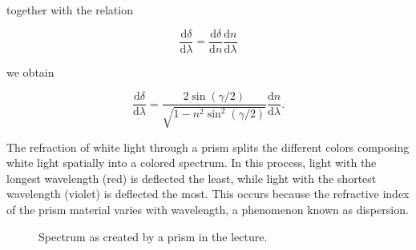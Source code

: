 \documentclass[
  a4paper,
]{book}
\begin{document}
together with the relation

\[\frac{\mathrm d \delta}{\mathrm d \lambda}=\frac{\mathrm d\delta}{\mathrm d n}\frac{\mathrm d n}{\mathrm d\lambda}\]

we obtain

\[\frac{\mathrm d\delta}{\mathrm d\lambda}=\frac{2\sin(\gamma/2)}{\sqrt{1-n^2\sin^2(\gamma/2)}}\frac{\mathrm d n}{\mathrm d \lambda}.\]

The refraction of white light through a prism splits the different
colors composing white light spatially into a colored spectrum. In this
process, light with the longest wavelength (red) is deflected the least,
while light with the shortest wavelength (violet) is deflected the most.
This occurs because the refractive index of the prism material varies
with wavelength, a phenomenon known as dispersion.

\begin{figure}


\caption{\label{fig-spectrum}Spectrum as created by a prism in the
lecture.}

\end{figure}%
\end{document}
